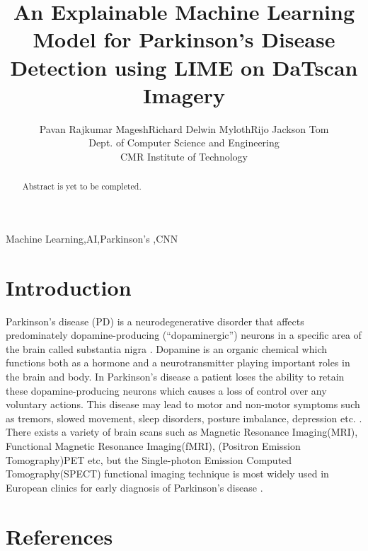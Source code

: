 \documentclass[preprint]{elsarticle}
\begin{document}
\begin{frontmatter}

\title{An Explainable Machine Learning Model for Parkinson's Disease Detection using LIME on DaTscan Imagery}

\author{Pavan Rajkumar Magesh\qquad Richard Delwin Myloth\qquad Rijo Jackson Tom
\\Dept. of Computer Science and Engineering
\\CMR Institute of Technology}

\begin{abstract}
Abstract is yet to be completed.
\end{abstract}

\begin{keyword}
Machine Learning\sep AI\sep Parkinson's \sep CNN
\end{keyword}

\end{frontmatter}

\section{Introduction}
Parkinson's disease (PD) is a neurodegenerative disorder that affects predominately dopamine-producing (“dopaminergic”) neurons in a specific area of the brain called substantia nigra \cite{cite1}. Dopamine is an organic chemical which functions both as a hormone and a neurotransmitter playing important roles in the brain and body. In Parkinson's disease a patient loses the ability to retain these dopamine-producing neurons which causes a loss of control over any voluntary actions. This disease may lead to motor and non-motor symptoms such as tremors, slowed movement, sleep disorders, posture imbalance, depression etc. \cite{cite2}. There exists a variety of brain scans such as Magnetic Resonance Imaging(MRI), Functional Magnetic Resonance Imaging(fMRI), (Positron Emission Tomography)PET etc, but the Single-photon Emission Computed Tomography(SPECT) functional imaging technique is most widely used in European clinics for early diagnosis of Parkinson's disease \cite{cite3}.

\section*{References}

\end{document}
